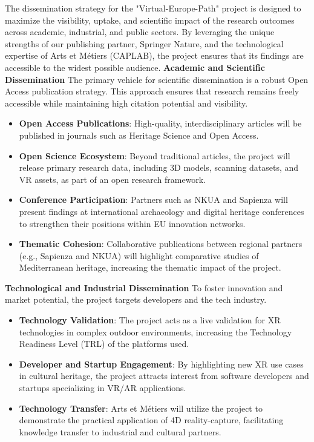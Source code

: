 The dissemination strategy for the "Virtual-Europe-Path" project is designed to maximize the visibility, uptake, and scientific impact of the research outcomes across academic, industrial, and public sectors. By leveraging the unique strengths of our publishing partner, Springer Nature, and the technological expertise of Arts et Métiers (CAPLAB), the project ensures that its findings are accessible to the widest possible audience.
\textbf{Academic and Scientific Dissemination}
The primary vehicle for scientific dissemination is a robust Open Access publication strategy. This approach ensures that research remains freely accessible while maintaining high citation potential and visibility.
\begin{itemize}
    \item \textbf{Open Access Publications}: High-quality, interdisciplinary articles will be published in journals such as Heritage Science and Open Access.
    \item \textbf{Open Science Ecosystem}: Beyond traditional articles, the project will release primary research data, including 3D models, scanning datasets, and VR assets, as part of an open research framework.
    \item \textbf{Conference Participation}: Partners such as NKUA and Sapienza will present findings at international archaeology and digital heritage conferences to strengthen their positions within EU innovation networks.
    \item \textbf{Thematic Cohesion}: Collaborative publications between regional partners (e.g., Sapienza and NKUA) will highlight comparative studies of Mediterranean heritage, increasing the thematic impact of the project.
\end{itemize}

\textbf{Technological and Industrial Dissemination}
To foster innovation and market potential, the project targets developers and the tech industry.
\begin{itemize}
    \item \textbf{Technology Validation}: The project acts as a live validation for XR technologies in complex outdoor environments, increasing the Technology Readiness Level (TRL) of the platforms used.
    \item \textbf{Developer and Startup Engagement}: By highlighting new XR use cases in cultural heritage, the project attracts interest from software developers and startups specializing in VR/AR applications.
    \item \textbf{Technology Transfer}: Arts et Métiers will utilize the project to demonstrate the practical application of 4D reality-capture, facilitating knowledge transfer to industrial and cultural partners.
\end{itemize}

